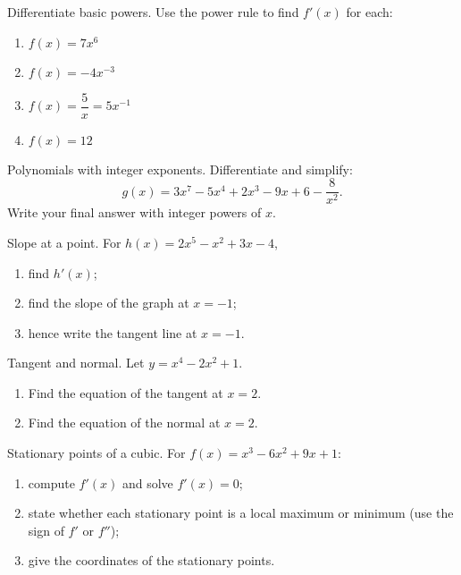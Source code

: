 \documentclass[11pt]{article}
\def\textbf#1{#1}%
\newcounter{question}
\begin{document}

\begin{question}
\textbf{Differentiate basic powers.}
Use the power rule to find $f'(x)$ for each:
\begin{enumerate}
  \item $f(x)=7x^{6}$
  \item $f(x)=-4x^{-3}$
  \item $f(x)=\dfrac{5}{x}=5x^{-1}$
  \item $f(x)=12$
\end{enumerate}
\end{question}

\begin{question}
\textbf{Polynomials with integer exponents.}
Differentiate and simplify:
\[
g(x)=3x^{7}-5x^{4}+2x^{3}-9x+6-\frac{8}{x^{2}}.
\]
Write your final answer with integer powers of $x$.
\end{question}

\begin{question}
\textbf{Slope at a point.}
For $h(x)=2x^{5}-x^{2}+3x-4$,
\begin{enumerate}
  \item find $h'(x)$;
  \item find the slope of the graph at $x=-1$;
  \item hence write the tangent line at $x=-1$.
\end{enumerate}
\end{question}

\begin{question}
\textbf{Tangent and normal.}
Let $y=x^{4}-2x^{2}+1$.
\begin{enumerate}
  \item Find the equation of the tangent at $x=2$.
  \item Find the equation of the normal at $x=2$.
\end{enumerate}
\end{question}

\begin{question}
\textbf{Stationary points of a cubic.}
For $f(x)=x^{3}-6x^{2}+9x+1$:
\begin{enumerate}
  \item compute $f'(x)$ and solve $f'(x)=0$;
  \item state whether each stationary point is a local maximum or minimum (use the sign of $f'$ or $f''$);
  \item give the coordinates of the stationary points.
\end{enumerate}
\end{question}
\end{document}
